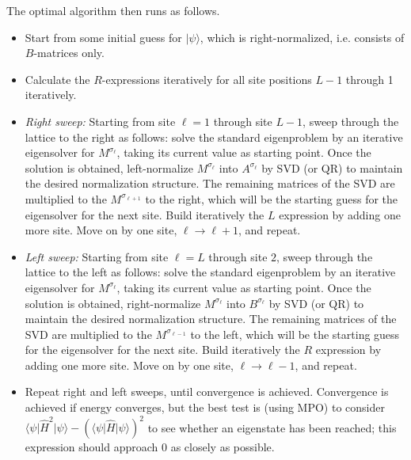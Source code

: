 \documentclass[a4paper,10pt,oneside,onecolumn,1p,times]{elsarticle}
\newcommand{\bra}[1]{\mbox{$\langle #1  |$}}
\newcommand{\ket}[1]{\mbox{$| #1  \rangle$}}
\begin{document}
The optimal algorithm then runs as follows. 
\begin{itemize}
\item Start from some initial guess for $\ket{\psi}$, which is right-normalized, i.e. consists of $B$-matrices only. 
\item Calculate the $R$-expressions iteratively for all site positions $L-1$ through 1 iteratively.
\item {\em Right sweep:} Starting from site $\ell=1$ through site $L-1$, sweep through the lattice to the right as follows: solve the standard eigenproblem by an iterative eigensolver for $M^{\sigma_\ell}$, taking its current value as starting point. Once the solution is obtained, left-normalize $M^{\sigma_\ell}$ into $A^{\sigma_\ell}$ by SVD (or QR) to maintain the desired normalization structure. The remaining matrices of the SVD are multiplied to the $M^{\sigma_{\ell+1}}$ to the right, which will be the starting guess for the eigensolver for the next site. Build iteratively the $L$ expression by adding one more site. Move on by one site, $\ell \rightarrow \ell+1$, and repeat.
\item {\em Left sweep:} Starting from site $\ell=L$ through site $2$, sweep through the lattice to the left as follows: solve the standard eigenproblem by an iterative eigensolver for $M^{\sigma_\ell}$, taking its current value as starting point. Once the solution is obtained, right-normalize $M^{\sigma_\ell}$ into $B^{\sigma_\ell}$ by SVD (or QR) to maintain the desired normalization structure. The remaining matrices of the SVD are multiplied to the $M^{\sigma_{\ell-1}}$ to the left, which will be the starting guess for the eigensolver for the next site. Build iteratively the $R$ expression by adding one more site. Move on by one site, $\ell \rightarrow \ell-1$, and repeat.
\item Repeat right and left sweeps, until convergence is achieved. Convergence is achieved if energy converges, but the best test is (using MPO) to consider
$\bra{\psi} \hat{H}^2 \ket{\psi} - (\bra{\psi} \hat{H} \ket{\psi})^2$ to see whether an eigenstate has been reached; this expression should approach 0 as closely as possible.
\end{itemize}
\end{document}
